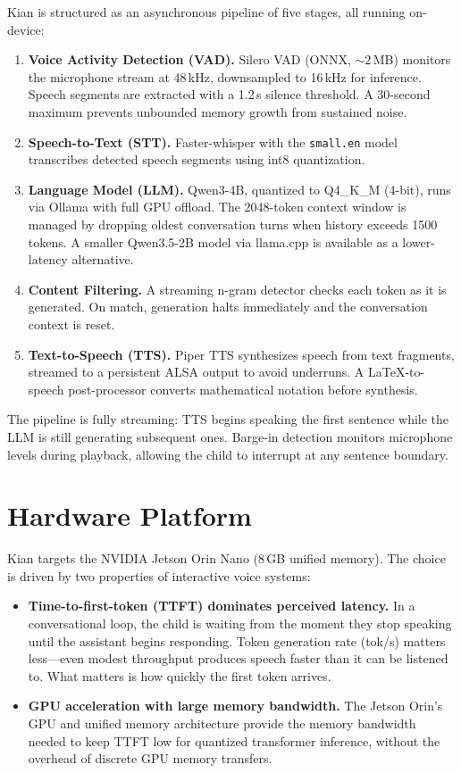 \documentclass[11pt]{article}
\begin{document}
Kian is structured as an asynchronous pipeline of five stages, all running on-device:

\begin{enumerate}[nosep]
  \item \textbf{Voice Activity Detection (VAD).} Silero VAD (ONNX, ${\sim}2$\,MB) monitors the microphone stream at 48\,kHz, downsampled to 16\,kHz for inference. Speech segments are extracted with a 1.2\,s silence threshold. A 30-second maximum prevents unbounded memory growth from sustained noise.
  \item \textbf{Speech-to-Text (STT).} Faster-whisper with the \texttt{small.en} model transcribes detected speech segments using int8 quantization.
  \item \textbf{Language Model (LLM).} Qwen3-4B, quantized to Q4\_K\_M (4-bit), runs via Ollama with full GPU offload. The 2048-token context window is managed by dropping oldest conversation turns when history exceeds 1500 tokens. A smaller Qwen3.5-2B model via llama.cpp is available as a lower-latency alternative.
  \item \textbf{Content Filtering.} A streaming n-gram detector checks each token as it is generated. On match, generation halts immediately and the conversation context is reset.
  \item \textbf{Text-to-Speech (TTS).} Piper TTS synthesizes speech from text fragments, streamed to a persistent ALSA output to avoid underruns. A LaTeX-to-speech post-processor converts mathematical notation before synthesis.
\end{enumerate}

\noindent The pipeline is fully streaming: TTS begins speaking the first sentence while the LLM is still generating subsequent ones. Barge-in detection monitors microphone levels during playback, allowing the child to interrupt at any sentence boundary.

\section{Hardware Platform}

Kian targets the NVIDIA Jetson Orin Nano (8\,GB unified memory). The choice is driven by two properties of interactive voice systems:

\begin{itemize}[nosep]
  \item \textbf{Time-to-first-token (TTFT) dominates perceived latency.} In a conversational loop, the child is waiting from the moment they stop speaking until the assistant begins responding. Token generation rate (tok/s) matters less---even modest throughput produces speech faster than it can be listened to. What matters is how quickly the first token arrives.
  \item \textbf{GPU acceleration with large memory bandwidth.} The Jetson Orin's GPU and unified memory architecture provide the memory bandwidth needed to keep TTFT low for quantized transformer inference, without the overhead of discrete GPU memory transfers.
\end{itemize}
\end{document}
